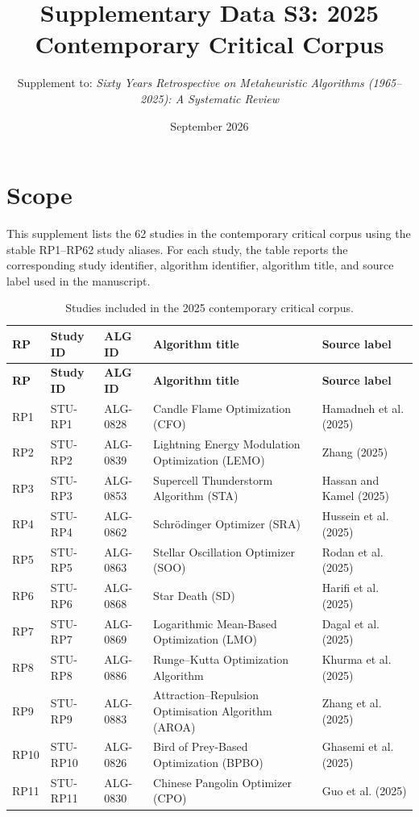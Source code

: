 \documentclass[9pt]{article}
\title{Supplementary Data S3: 2025 Contemporary Critical Corpus}
\author{Supplement to: \textit{Sixty Years Retrospective on Metaheuristic Algorithms (1965--2025): A Systematic Review}}
\date{September 2026}
\begin{document}
\maketitle
\section*{Scope}
This supplement lists the 62 studies in the contemporary critical corpus using the stable RP1--RP62 study aliases. For each study, the table reports the corresponding study identifier, algorithm identifier, algorithm title, and source label used in the manuscript.

\begin{landscape}
\scriptsize
\begin{longtable}{P{1.1cm}P{1.8cm}P{1.8cm}P{9.5cm}P{6.0cm}}
\caption{Studies included in the 2025 contemporary critical corpus.}\\
\toprule
\textbf{RP} & \textbf{Study ID} & \textbf{ALG ID} & \textbf{Algorithm title} & \textbf{Source label}\\
\midrule\endfirsthead
\toprule
\textbf{RP} & \textbf{Study ID} & \textbf{ALG ID} & \textbf{Algorithm title} & \textbf{Source label}\\
\midrule\endhead
RP1 & STU-RP1 & ALG-0828 & Candle Flame Optimization (CFO) & Hamadneh et al. (2025) \\
RP2 & STU-RP2 & ALG-0839 & Lightning Energy Modulation Optimization (LEMO) & Zhang (2025) \\
RP3 & STU-RP3 & ALG-0853 & Supercell Thunderstorm Algorithm (STA) & Hassan and Kamel (2025) \\
RP4 & STU-RP4 & ALG-0862 & Schrödinger Optimizer (SRA) & Hussein et al. (2025) \\
RP5 & STU-RP5 & ALG-0863 & Stellar Oscillation Optimizer (SOO) & Rodan et al. (2025) \\
RP6 & STU-RP6 & ALG-0868 & Star Death (SD) & Harifi et al. (2025) \\
RP7 & STU-RP7 & ALG-0869 & Logarithmic Mean-Based Optimization (LMO) & Dagal et al. (2025) \\
RP8 & STU-RP8 & ALG-0886 & Runge–Kutta Optimization Algorithm & Khurma et al. (2025) \\
RP9 & STU-RP9 & ALG-0883 & Attraction–Repulsion Optimisation Algorithm (AROA) & Zhang et al. (2025) \\
RP10 & STU-RP10 & ALG-0826 & Bird of Prey-Based Optimization (BPBO) & Ghasemi et al. (2025) \\
RP11 & STU-RP11 & ALG-0830 & Chinese Pangolin Optimizer (CPO) & Guo et al. (2025) \\

\end{longtable}
\end{landscape}
\end{document}
